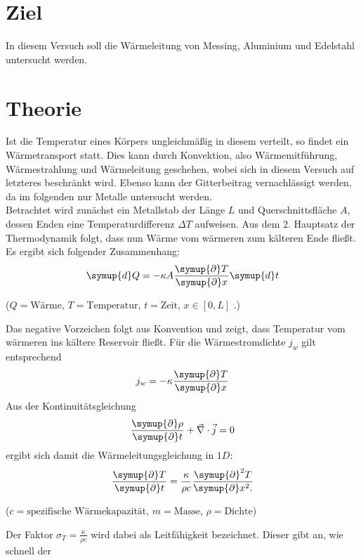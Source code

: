 
\section{Ziel}
In diesem Versuch soll die Wärmeleitung von Messing, Aluminium und Edelstahl untersucht werden.
\section{Theorie}
Ist die Temperatur eines Körpers ungleichmäßig in diesem verteilt, so findet ein Wärmetransport statt.
Dies kann durch Konvektion, also Wärmemitführung, Wärmestrahlung und Wärmeleitung geschehen,
wobei sich in diesem Versuch auf letzteres beschränkt wird.
Ebenso kann der Gitterbeitrag vernachlässigt werden, da im folgenden nur Metalle untersucht werden.
\\
Betrachtet wird zunächst ein Metallstab der Länge $L$ und Querschnittsfläche $A$,
dessen Enden eine Temperaturdifferenz $\Delta T$ aufweisen.
Aus dem 2. Hauptsatz der Thermodynamik folgt, dass nun Wärme vom wärmeren zum kälteren Ende fließt.
Es ergibt sich folgender Zusammenhang:
\begin{equation}
  \symup{d}Q=-\kappa A\frac{\symup{\partial}T}{\symup{\partial}x}\symup{d}t
  \label{eqn:dQ}
\end{equation}
\begin{center}
 \small {($Q=\text{Wärme}$,  $T=\text{Temperatur}$, $t=\text{Zeit}$, $ x \in [0, L]$ .)}
\end{center}
Das negative Vorzeichen folgt aus Konvention und zeigt, dass Temperatur vom wärmeren ins kältere Reservoir fließt.
Für die Wärmestromdichte $j_w$ gilt entsprechend
\begin{equation}
  j_w=-\kappa \frac{\symup{\partial}T}{\symup{\partial}x}
\end{equation}
Aus der Kontinuitätsgleichung
\begin{equation}
  \frac{\symup{\partial}\rho}{\symup{\partial}t} + \vec{\nabla} \cdot \vec{j} =0
\end{equation}
ergibt sich damit die Wärmeleitungsgleichung in $1D$:
\begin{equation}
  \frac{\symup{\partial}T}{\symup{\partial}t} = \frac{\kappa}{\rho c} \frac{\symup{\partial}^2T}{\symup{\partial}x^2 .}
  \label{eqn:WLG}
\end{equation}
\begin{center}
 \small {($c=\text{spezifische Wärmekapazität}$,  $m=\text{Masse}$, $\rho=\text{Dichte}$})
\end{center}
Der Faktor $\sigma_T=\frac{\kappa}{\rho c}$ wird dabei als Leitfähigkeit bezeichnet. Dieser gibt an, wie schnell der
